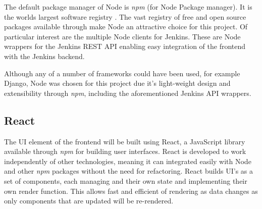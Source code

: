 The default package manager of Node is \textit{npm} (for Node Package manager). It is the worlds largest software registry \citep{npm}. The vast registry of free and open source packages available through make Node an attractive choice for this project. Of particular interest are the multiple Node clients for Jenkins. These are Node wrappers for the Jenkins REST API enabling easy integration of the frontend with the Jenkins backend.

Although any of a number of frameworks could have been used, for example Django, Node was chosen for this project due it's light-weight design and extensibility through \textit{npm}, including the aforementioned Jenkins API wrappers.
 
\subsection{React}
The UI element of the frontend will be built using React, a JavaScript library available through \textit{npm} for building user interfaces. React is developed to work independently of other technologies, meaning it can integrated easily with Node and other \textit{npm} packages without the need for refactoring. React builds UI's as a set of components, each managing and their own state and implementing their own render function. This allows fast and efficient of rendering as data changes as only components that are updated will be re-rendered.

